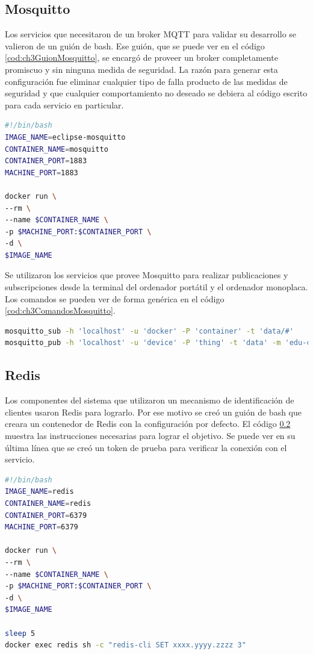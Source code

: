 \subsection{Mosquitto}

Los servicios que necesitaron de un broker MQTT para validar su desarrollo se valieron de un guión de bash.
Ese guión, que se puede ver en el código \ref{cod:ch3GuionMosquitto}, se encargó de proveer un broker completamente promiscuo y sin ninguna medida de seguridad.
La razón para generar esta configuración fue eliminar cualquier tipo de falla producto de las medidas de seguridad y que cualquier comportamiento no deseado se debiera al código escrito para cada servicio en particular.

\begin{lstlisting}[language=bash,label=cod:ch3GuionMosquitto,caption=Guión de Mosquitto.]
#!/bin/bash
IMAGE_NAME=eclipse-mosquitto
CONTAINER_NAME=mosquitto
CONTAINER_PORT=1883
MACHINE_PORT=1883

docker run \
--rm \
--name $CONTAINER_NAME \
-p $MACHINE_PORT:$CONTAINER_PORT \
-d \
$IMAGE_NAME
\end{lstlisting}

Se utilizaron los servicios que provee Mosquitto para realizar publicaciones y subscripciones desde la terminal del ordenador portátil y el ordenador monoplaca.
Los comandos se pueden ver de forma genérica en el código \ref{cod:ch3ComandosMosquitto}.

\begin{lstlisting}[language=bash,label=cod:ch3ComandosMosquitto,caption=Comandos de Mosquitto.]
mosquitto_sub -h 'localhost' -u 'docker' -P 'container' -t 'data/#'
mosquitto_pub -h 'localhost' -u 'device' -P 'thing' -t 'data' -m 'edu-ciaa,25'
\end{lstlisting}

\subsection{Redis}

Los componentes del sistema que utilizaron un mecanismo de identificación de clientes usaron Redis para lograrlo.
Por ese motivo se creó un guión de bash que creara un contenedor de Redis con la configuración por defecto.
El código \ref{} muestra las instrucciones necesarias para lograr el objetivo.
Se puede ver en su última línea que se creó un token de prueba para verificar la conexión con el servicio.

\begin{lstlisting}[language=bash,label=cod:ch3GuionRedis,caption=Guión de Redis.]
#!/bin/bash
IMAGE_NAME=redis
CONTAINER_NAME=redis
CONTAINER_PORT=6379
MACHINE_PORT=6379

docker run \
--rm \
--name $CONTAINER_NAME \
-p $MACHINE_PORT:$CONTAINER_PORT \
-d \
$IMAGE_NAME

sleep 5
docker exec redis sh -c "redis-cli SET xxxx.yyyy.zzzz 3"
\end{lstlisting}

